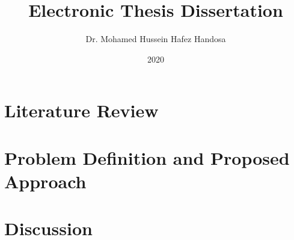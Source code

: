 \documentclass[12pt,a4paper,oneside]{book}
\title{Electronic Thesis Dissertation}
\author{Dr. Mohamed Hussein Hafez Handosa}
\date{2020}
\begin{document}
\pagestyle{fancy}

\frontmatter







\tableofcontents

\listoffigures

\listoftables

\mainmatter



\part{Literature Review}








\part{Problem Definition and Proposed Approach}


\part{Discussion}



\begin{appendices}

\end{appendices}

\backmatter

\printglossary[type=\acronymtype]
\end{document}
